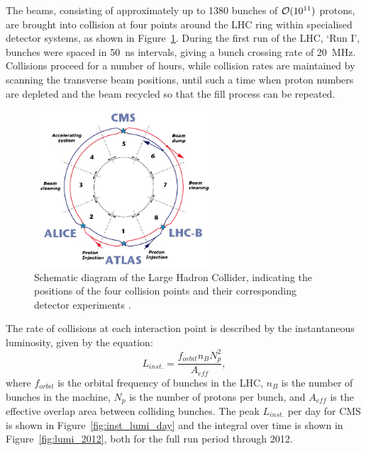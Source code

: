 The beams, consisting of approximately up to 1380 bunches of $\mathcal{O}(10^{11})$
protons, are brought into collision
at four points around the LHC ring within specialised detector systems, as shown
in Figure~\ref{fig:lhc_diagram}. During the
first run of the LHC, `Run I', bunches were spaced in 50~ns intervals, giving
a bunch crossing rate of 20~MHz. Collisions proceed for a number of hours, 
while collision rates are maintained by scanning the transverse beam positions, 
until such a time when proton numbers are depleted and the beam recycled so that
the fill process can be repeated.

\begin{figure}[ht!]
\centering
\includegraphics[width=0.6\textwidth]{Figs/machine/lhc-pho-1997-203_english.jpg}
\caption{Schematic diagram of the Large Hadron Collider, indicating the 
positions of the four collision points and their corresponding detector 
experiments \cite{Vittorio:842611}.}
\label{fig:lhc_diagram}
\end{figure}


The rate of collisions at each interaction point is described by the 
instantaneous luminosity, given by the equation:
% 
\begin{equation}
L_{inst.} = \frac{f_{orbit}n_{B}N_p^2}{A_{eff}} ,
\end{equation}
% 
where $f_{orbit}$ is the orbital frequency of bunches in the LHC, $n_B$ is the 
number of bunches in the machine, $N_p$ is the number of protons per bunch, and 
$A_{eff}$ is the effective overlap area between colliding bunches. The peak 
$L_{inst.}$ per day for CMS is shown in Figure~\ref{fig:inst_lumi_day} and the
integral over time is shown in Figure~\ref{fig:lumi_2012}, both for the full run
period through 2012.

